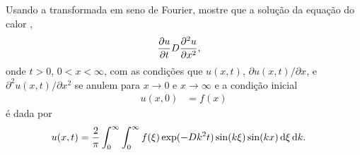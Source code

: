 \documentclass[a4paper,12pt, leqno, answers]{exam}
\begin{document}
\begin{questions}
    \question Usando a transformada em seno de Fourier, mostre que a
    solu\c{c}\~{a}o da equa\c{c}\~{a}o do calor ,
    \begin{align*}
        \frac{\partial u}{\partial t} & D \frac{\partial ^2 u}{\partial x^2},
    \end{align*}
    onde $t > 0$, $0 < x < \infty$, com as condi\c{c}\~{o}es que $u(x, t)$,
    $\partial u(x, t) / \partial x$, e $\partial^2 u(x, t) / \partial x^2$ se
    anulem para $x \to 0$ e $x \to \infty$ e a condi\c{c}\~{a}o inicial
    \begin{align*}
        u(x, 0) &= f(x)
    \end{align*}
    \'{e} dada por
    \begin{align*}
        u(x,t) &= \frac{2}{\pi} \int_0^\infty \int_0^\infty f(\xi) \exp(-D
        k^2 t) \sin(k \xi) \sin(k x) \, \mathrm{d}\xi \, \mathrm{d}k.
    \end{align*}
    \begin{solution}
    \end{solution}
\end{questions}
% 
% 
\end{document}
